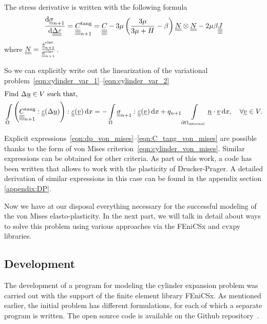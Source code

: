 \documentclass[12pt]{article}
\begin{document}
The stress derivative is written with the following formula
\begin{equation}
    \dfrac{\mathrm{d}\underline{\underline{\sigma}}_{n+1}}{\mathrm{d}\underline{\underline{\Delta\varepsilon}}} = \underline{\underline{\underline{\underline{C_{}}}}}_{n+1}^{\text{tang}} = \underline{\underline{\underline{\underline{C_{}}}}} - 3\mu \left( \frac{3\mu}{3\mu + H} -\beta \right) \underline{\underline{N}} \otimes \underline{\underline{N}} - 2\mu\beta\underline{\underline{\underline{\underline{J}}}} \label{eqn:C_tang_von_mises}
\end{equation}
where $\underline{\underline{N}} = \frac{\underline{\underline{s}}^\text{elas}_{n+1}}{\underline{\underline{\sigma}}_{n+1}^{\text{elas}}}$.

So we can explicitly write out the linearization of the variational problem~\eqref{eqn:cylinder_var_1}--\eqref{eqn:cylinder_var_2}
\begin{align}
    & \text{Find } \Delta\underline{u} \in V \text{ such that,} \label{eqn:cylinder_lin_var_from_1} \\ 
    & \int\limits_\Omega \left( \underline{\underline{\underline{\underline{C_{}}}}}_{n+1}^\text{tang} : \underline{\underline{\varepsilon}}(\Delta\underline{u}) \right) : \underline{\underline{\varepsilon}}(\underline{v}) \, \mathrm{d} x = -\int\limits_\Omega\underline{\underline{\sigma}}_{n+1} : \underline{\underline{\varepsilon}}(\underline{v}) \, \mathrm{d} x + q_{n+1}\int\limits_{\partial\Omega_\text{internal}}\underline{n} \cdot \underline{v} \, \mathrm{d} x, \quad \forall \underline{v} \in V. \label{eqn:cylinder_lin_var_from_2} 
\end{align}

Explicit expressions~\eqref{eqn:dp_von_mises}--\eqref{eqn:C_tang_von_mises} are possible thanks to the form of von Mises criterion~\eqref{eqn:cylinder_von_mises}. Similar expressions can be obtained for other criteria. As part of this work, a code has been written that allows to work with the plasticity of Drucker-Prager. A detailed derivation of similar expressions in this case can be found in the appendix section \ref{appendix:DP}.

Now we have at our disposal everything necessary for the successful modeling of the von Mises elasto-plasticity. In the next part, we will talk in detail about ways to solve this problem using various approaches via the FEniCSx and cvxpy libraries.

\subsection{Development}
\label{sec:development}

The development of a program for modeling the cylinder expansion problem was carried out with the support of the finite element library FEniCSx. As mentioned earlier, the initial problem has different formulations, for each of which a separate program is written. The open source code is available on the Github repository~\cite{convex-plasticity}. 
\end{document}
